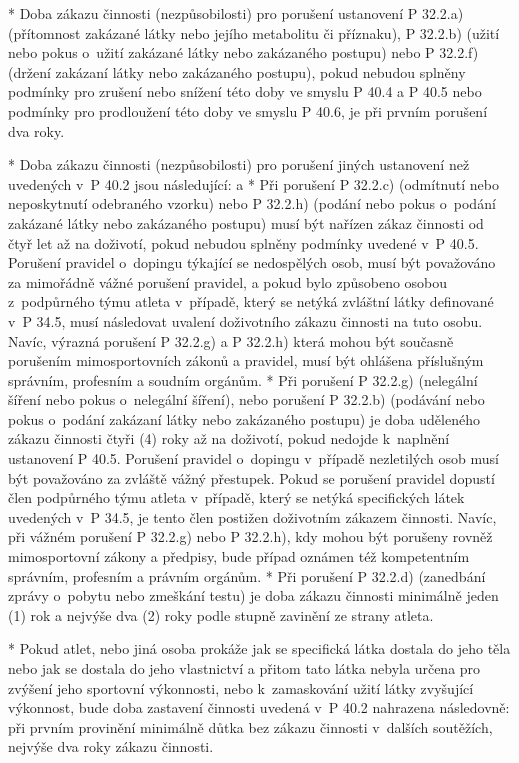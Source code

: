 * Doba zákazu činnosti (nezpůsobilosti) pro porušení ustanovení P 32.2.a) (přítomnost zakázané látky nebo jejího metabolitu či příznaku), P 32.2.b) (užití nebo pokus o~užití zakázané látky nebo zakázaného postupu) nebo P 32.2.f) (držení zakázaní látky nebo zakázaného postupu), pokud nebudou splněny podmínky pro zrušení nebo snížení této doby ve smyslu P 40.4 a P 40.5 nebo podmínky pro prodloužení této doby ve smyslu P 40.6, je při prvním porušení  dva roky.

* Doba zákazu činnosti (nezpůsobilosti) pro porušení jiných ustanovení než uvedených v~P 40.2 jsou následující:
  \begitems \style a
  * Při porušení P 32.2.c) (odmítnutí nebo neposkytnutí odebraného vzorku) nebo P 32.2.h) (podání nebo pokus o~podání zakázané látky nebo zakázaného postupu) musí být nařízen zákaz činnosti od čtyř let až na doživotí, pokud nebudou splněny podmínky uvedené v~P 40.5. Porušení pravidel o~dopingu týkající se nedospělých osob, musí být považováno za mimořádně vážné porušení pravidel, a pokud bylo způsobeno osobou z~podpůrného týmu atleta v~případě, který se netýká zvláštní látky definované v~P 34.5, musí následovat uvalení doživotního zákazu činnosti na tuto osobu. Navíc, výrazná porušení P 32.2.g) a P 32.2.h) která mohou být současně porušením mimosportovních zákonů a pravidel, musí být ohlášena příslušným správním, profesním a soudním orgánům.
  * Při porušení P 32.2.g) (nelegální šíření nebo pokus o~nelegální šíření), nebo porušení P 32.2.b) (podávání nebo pokus o~podání zakázaní látky nebo zakázaného postupu) je doba uděleného zákazu činnosti čtyři (4) roky až na doživotí, pokud nedojde k~naplnění ustanovení P 40.5. Porušení pravidel o~dopingu v~případě nezletilých osob musí být považováno za zvláště vážný přestupek. Pokud se porušení pravidel dopustí člen podpůrného týmu atleta v~případě, který se netýká specifických látek uvedených v~P 34.5, je tento člen postižen doživotním zákazem činnosti. Navíc, při vážném porušení P 32.2.g) nebo P 32.2.h), kdy mohou být porušeny rovněž mimosportovní zákony a předpisy, bude případ oznámen též kompetentním správním, profesním a právním orgánům.
  * Při porušení P 32.2.d) (zanedbání zprávy o~pobytu nebo zmeškání testu) je doba zákazu činnosti minimálně jeden (1) rok a nejvýše dva (2) roky podle stupně zavinění ze strany atleta.
  \enditems

* Pokud atlet, nebo jiná osoba prokáže jak se specifická látka dostala do jeho těla nebo jak se dostala do jeho vlastnictví a přitom tato látka nebyla určena pro zvýšení jeho sportovní výkonnosti, nebo k~zamaskování užití látky zvyšující výkonnost, bude doba zastavení činnosti uvedená v~P 40.2 nahrazena následovně: při prvním provinění minimálně důtka bez zákazu činnosti v~dalších soutěžích, nejvýše dva roky zákazu činnosti.

